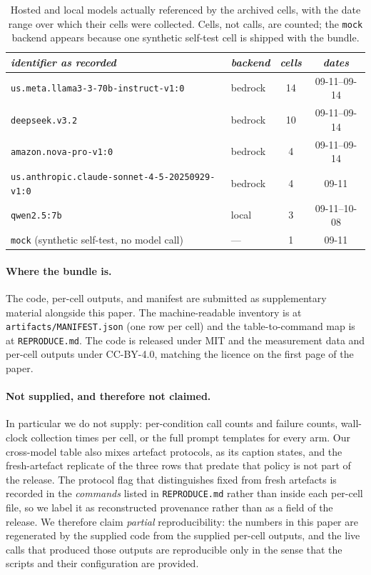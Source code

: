 \documentclass[sigconf,anonymous]{aamas}
\begin{document}
\begin{table}[h]
\scriptsize
\centering
\caption{Hosted and local models actually referenced by the archived cells, with the
date range over which their cells were collected. Cells, not calls, are counted; the
\texttt{mock} backend appears because one synthetic self-test cell is shipped with the
bundle.}
\vspace{4pt}
\label{tab:models-manifest}
\begin{tabular}{llcc}
\toprule
\textit{identifier as recorded} & \textit{backend} & \textit{cells} & \textit{dates} \\
\midrule
\texttt{us.meta.llama3-3-70b-instruct-v1:0}      & bedrock & 14 & 09-11--09-14 \\
\texttt{deepseek.v3.2}                            & bedrock & 10 & 09-11--09-14 \\
\texttt{amazon.nova-pro-v1:0}                     & bedrock & 4  & 09-11--09-14 \\
\texttt{us.anthropic.claude-sonnet-4-5-20250929-v1:0} & bedrock & 4 & 09-11 \\
\texttt{qwen2.5:7b}                               & local   & 3  & 09-11--10-08 \\
\texttt{mock} (synthetic self-test, no model call) & ---    & 1  & 09-11 \\
\bottomrule
\end{tabular}
\end{table}

\paragraph{Where the bundle is.} The code, per-cell outputs, and manifest are submitted
as supplementary material alongside this paper. The machine-readable inventory is at
\texttt{artifacts/MANIFEST.json} (one row per cell) and the table-to-command map is at
\texttt{REPRODUCE.md}. The code is released under MIT and the measurement data and
per-cell outputs under CC-BY-4.0, matching the licence on the first page of the paper.

\paragraph{Not supplied, and therefore not claimed.} In particular we do
not supply: per-condition call counts and failure counts, wall-clock collection times
per cell, or the full prompt templates for every arm. Our cross-model table also mixes
artefact protocols, as its caption states, and the fresh-artefact replicate of the
three rows that predate that policy is not part of the release. The protocol flag that
distinguishes fixed from fresh artefacts is recorded in the \emph{commands} listed in
\texttt{REPRODUCE.md} rather than inside each per-cell file, so we label it as
reconstructed provenance rather than as a field of the release. We therefore claim
\emph{partial} reproducibility: the numbers in this paper are regenerated by the
supplied code from the supplied per-cell outputs, and the live calls that produced
those outputs are reproducible only in the sense that the scripts and their
configuration are provided.
\end{document}
